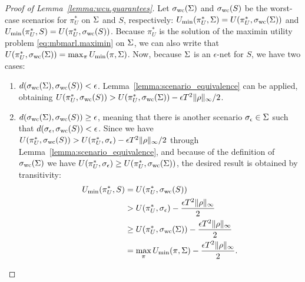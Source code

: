 \begin{proof}[Proof of Lemma~\ref{lemma:wcu.guarantees}]
     Let $\sigma_\text{wc}(\Sigma)$ and $\sigma_\text{wc}(S)$ be the worst-case scenarios for $\pi^*_U$ on $\Sigma$ and $S$, respectively: $U_\text{min}(\pi^*_U, \Sigma) = U(\pi^*_U, \sigma_\text{wc}(\Sigma))$ and $U_\text{min}(\pi^*_U, S) = U(\pi^*_U, \sigma_\text{wc}(S))$. Because $\pi^*_U$ is the solution of the maximin utility problem \eqref{eq:mbmarl.maximin} on $\Sigma$, we can also write that $U(\pi^*_U, \sigma_\text{wc}(\Sigma)) = \max_\pi U_\text{min}(\pi, \Sigma)$. Now, because $\Sigma$ is an $\epsilon$-net for $S$, we have two cases: 
    \begin{enumerate}
        \item $d(\sigma_\text{wc}(\Sigma), \sigma_\text{wc}(S)) < \epsilon$. Lemma~\ref{lemma:scenario_equivalence} can be applied, obtaining $U(\pi^*_U, \sigma_\text{wc}(S)) > U(\pi^*_U, \sigma_\text{wc}(\Sigma)) - \epsilon T^2 \lVert \rho \rVert_\infty/2$.
        
        \item $d(\sigma_\text{wc}(\Sigma), \sigma_\text{wc}(S)) \geq \epsilon$, meaning that there is another scenario $\sigma_\epsilon \in \Sigma$ such that  $d(\sigma_\epsilon, \sigma_\text{wc}(S)) < \epsilon$.
        Since we have $U(\pi^*_U, \sigma_\text{wc}(S)) > U(\pi^*_U,\sigma_\epsilon) - \epsilon T^2 \lVert \rho \rVert_\infty/2$ through Lemma~\ref{lemma:scenario_equivalence}, and because of the definition of $\sigma_\text{wc}(\Sigma)$ we have $U(\pi^*_U, \sigma_\epsilon)\geq U(\pi^*_U, \sigma_\text{wc}(\Sigma))$, the desired result is obtained by transitivity:
        \begin{align}
            U_\text{min}(\pi^*_U, S) &= U(\pi^*_U, \sigma_\text{wc}(S))\\
            &> U(\pi^*_U,\sigma_\epsilon) - \dfrac{\epsilon T^2\lVert \rho \rVert_\infty}{2}\\
            & \geq U(\pi^*_U, \sigma_\text{wc}(\Sigma)) - \dfrac{\epsilon T^2\lVert \rho \rVert_\infty}{2}\\
            & = \max_\pi U_\text{min}(\pi, \Sigma) - \dfrac{\epsilon T^2\lVert \rho \rVert_\infty}{2}.
        \end{align}
    \end{enumerate}
\end{proof}

